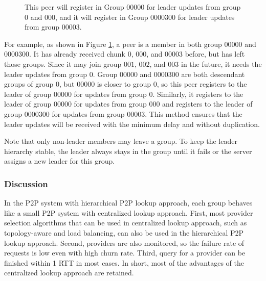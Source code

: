     \begin{figure}[t]
    \centering
    \caption[Peer register in various groups.]
    {This peer will register in Group $00000$ for leader
    updates from group $0$
    and $000$, and it will register in Group $0000300$ for leader
    updates from group $00003$. 
    \label{f:register}}
    \end{figure}
    For example, as shown in Figure \ref{f:register}, a peer is a member in both group
    $00000$ and $0000300$. It has already received chunk $0$, $000$,
    and $00003$ before, but has left those groups. Since it
    may join group $001$, $002$, and $003$ in the future, it needs the
    leader updates from group $0$. Group $00000$ and $0000300$ are
    both descendant groups of group $0$, but $00000$ is closer to group
    $0$, so this peer registers to the leader of group $00000$ %
    for updates from group $0$. 
    Similarly, it registers to the leader of 
    group $00000$ %
    for updates from group $000$
    and registers to the leader of group $0000300$ %
    for updates
    from group $00003$. 
    This method ensures that the leader updates will be received with
    the minimum delay
    and without duplication.

    Note that only non-leader members may leave a group. To keep the leader
    hierarchy stable, the leader always stays in the group until
    it fails or the server assigns a new leader for this group.
    
    \subsubsection{Discussion}
    In the P2P system with hierarchical P2P lookup approach, %
    each group behaves like a small P2P system with centralized lookup
    approach. 
    First, most provider selection algorithms that can be used in centralized
    lookup approach, 
    such as topology-aware and load balancing, can also
    be used in the hierarchical P2P lookup approach. %
    Second, providers are also monitored, so the failure rate of requests is 
    low even with high churn rate. Third,
    query for a provider can be finished within 1 RTT in
    most cases. In short, most of the advantages of the 
    centralized lookup approach are retained.

